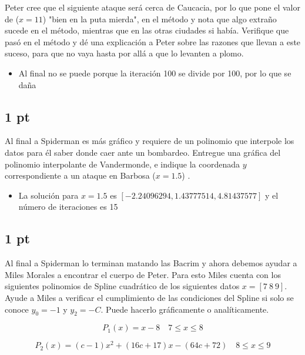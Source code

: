 Peter cree que el siguiente ataque será cerca de Caucacia, por lo que pone el valor de ($x=11$) "bien en la puta mierda", en el método y nota que algo extraño sucede en el método, mientras que en las otras ciudades si había. Verifique que pasó en el método y dé una explicación a Peter sobre las razones que llevan a este suceso, para que no vaya hasta por allá a que lo levanten a plomo.

\begin{itemize}
    \item  Al final no se puede porque la iteración 100 se divide por 100, por lo que se daña
\end{itemize}

\subsection{1 pt}

Al final a Spiderman es más gráfico y requiere de un polinomio que interpole los datos para él saber donde caer ante un bombardeo. Entregue una gráfica del polinomio interpolante de Vandermonde, e indique la coordenada $y$ correspondiente a un ataque en Barbosa ($x=1.5$) .

\begin{itemize}
    \item La solución para $x=1.5$ es $[-2.24096294,  1.43777514,  4.81437577]$ y el número de iteraciones es 15
\end{itemize}

\subsection{1 pt}

Al final a Spiderman lo terminan matando las Bacrim y ahora debemos ayudar a Miles Morales a encontrar el cuerpo de Peter. Para esto Miles cuenta con los siguientes polinomios de Spline cuadrático de los siguientes datos \( x = [7\ 8\ 9] \). Ayude a Miles a verificar el cumplimiento de las condiciones del Spline si solo se conoce \( y_0 = -1 \) y \( y_2 = -C \). Puede hacerlo gráficamente o analíticamente.

\[
    P_1(x) = x - 8 \quad 7 \leq x \leq 8
\]

\[
    P_2(x) = (c - 1)x^2 + (16c + 17)x - (64c + 72)  \quad 8 \leq x \leq 9
\]

